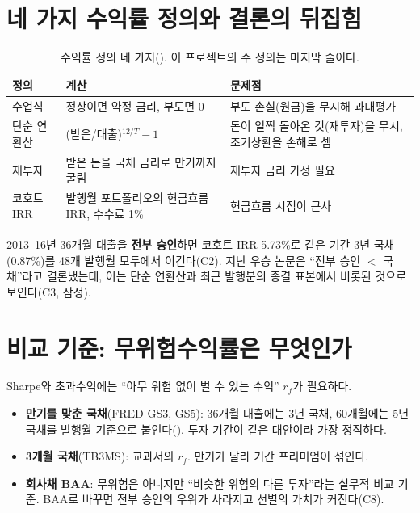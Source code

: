 \section{네 가지 수익률 정의와 결론의 뒤집힘}
\begin{table}[H]\centering\small
\begin{tabularx}{\linewidth}{@{}p{34mm}LL@{}}\toprule
정의 & 계산 & 문제점\\\midrule
수업식 & 정상이면 약정 금리, 부도면 0 & 부도 손실(원금)을 무시해 과대평가\\
단순 연환산 & (받은/대출)$^{12/T}-1$ & 돈이 일찍 돌아온 것(재투자)을 무시, 조기상환을 손해로 셈\\
재투자 & 받은 돈을 국채 금리로 만기까지 굴림 & 재투자 금리 가정 필요\\
코호트 IRR & 발행월 포트폴리오의 현금흐름 IRR, 수수료 1\% & 현금흐름 시점이 근사\\\bottomrule
\end{tabularx}
\caption{수익률 정의 네 가지(). 이 프로젝트의 주 정의는 마지막 줄이다.}
\end{table}

\begin{keybox}[결과 C1--C3]
2013--16년 36개월 대출을 \textbf{전부 승인}하면 코호트 IRR 5.73\%로 같은 기간 3년 국채(0.87\%)를 48개 발행월 모두에서 이긴다(C2). 지난 우승 논문은 ``전부 승인 \ensuremath{<} 국채''라고 결론냈는데, 이는 단순 연환산과 최근 발행분의 종결 표본에서 비롯된 것으로 보인다(C3, 잠정).
\end{keybox}

\section{비교 기준: 무위험수익률은 무엇인가}
Sharpe와 초과수익에는 ``아무 위험 없이 벌 수 있는 수익'' $r_f$가 필요하다.
\begin{itemize}[leftmargin=*]
\item \textbf{만기를 맞춘 국채}(FRED GS3, GS5): 36개월 대출에는 3년 국채, 60개월에는 5년 국채를 발행월 기준으로 붙인다(). 투자 기간이 같은 대안이라 가장 정직하다.
\item \textbf{3개월 국채}(TB3MS): 교과서의 $r_f$. 만기가 달라 기간 프리미엄이 섞인다.
\item \textbf{회사채 BAA}: 무위험은 아니지만 ``비슷한 위험의 다른 투자''라는 실무적 비교 기준. BAA로 바꾸면 전부 승인의 우위가 사라지고 선별의 가치가 커진다(C8).
\end{itemize}

